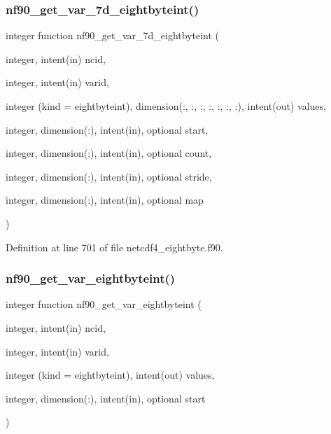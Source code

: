 \subsubsection{\texorpdfstring{nf90\+\_\+get\+\_\+var\+\_\+7d\+\_\+eightbyteint()}{nf90\_get\_var\_7d\_eightbyteint()}}
{\footnotesize\ttfamily integer function nf90\+\_\+get\+\_\+var\+\_\+7d\+\_\+eightbyteint (\begin{DoxyParamCaption}\item[{integer, intent(in)}]{ncid,  }\item[{integer, intent(in)}]{varid,  }\item[{integer (kind = eightbyteint), dimension(\+:, \+:, \+:, \+:, \+:, \+:, \+:), intent(out)}]{values,  }\item[{integer, dimension(\+:), intent(in), optional}]{start,  }\item[{integer, dimension(\+:), intent(in), optional}]{count,  }\item[{integer, dimension(\+:), intent(in), optional}]{stride,  }\item[{integer, dimension(\+:), intent(in), optional}]{map }\end{DoxyParamCaption})}



Definition at line 701 of file netcdf4\+\_\+eightbyte.\+f90.

\mbox{\label{netcdf4__eightbyte_8f90_acdfad8c826daa4962a18f239a1495bf3}} 
\subsubsection{\texorpdfstring{nf90\+\_\+get\+\_\+var\+\_\+eightbyteint()}{nf90\_get\_var\_eightbyteint()}}
{\footnotesize\ttfamily integer function nf90\+\_\+get\+\_\+var\+\_\+eightbyteint (\begin{DoxyParamCaption}\item[{integer, intent(in)}]{ncid,  }\item[{integer, intent(in)}]{varid,  }\item[{integer (kind = eightbyteint), intent(out)}]{values,  }\item[{integer, dimension(\+:), intent(in), optional}]{start }\end{DoxyParamCaption})}



